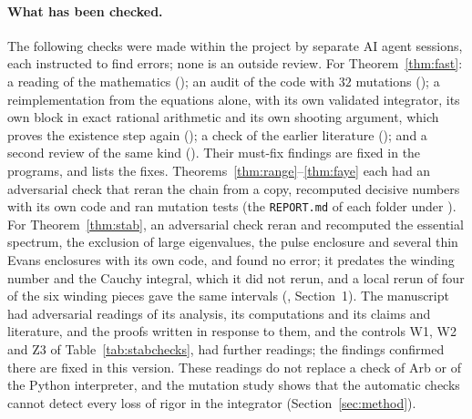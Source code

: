 \documentclass[11pt]{article}
\theoremstyle{definition}
\begin{document}
\paragraph{What has been checked.} The following checks were made within the project by separate AI agent sessions, each instructed to find errors; none is an outside review. For Theorem~\ref{thm:fast}: a reading of the mathematics (); an audit of the code with $32$ mutations (); a reimplementation from the equations alone, with its own validated integrator, its own block in exact rational arithmetic and its own shooting argument, which proves the existence step again (); a check of the earlier literature (); and a second review of the same kind (). Their must-fix findings are fixed in the programs, and  lists the fixes. Theorems~\ref{thm:range}--\ref{thm:faye} each had an adversarial check that reran the chain from a copy, recomputed decisive numbers with its own code and ran mutation tests (the \texttt{REPORT.md} of each folder under ). For Theorem~\ref{thm:stab}, an adversarial check reran and recomputed the essential spectrum, the exclusion of large eigenvalues, the pulse enclosure and several thin Evans enclosures with its own code, and found no error; it predates the winding number and the Cauchy integral, which it did not rerun, and a local rerun of four of the six winding pieces gave the same intervals (, Section~1). The manuscript had adversarial readings of its analysis, its computations and its claims and literature, and the proofs written in response to them, and the controls W1, W2 and Z3 of Table~\ref{tab:stabchecks}, had further readings; the findings confirmed there are fixed in this version. These readings do not replace a check of Arb or of the Python interpreter, and the mutation study shows that the automatic checks cannot detect every loss of rigor in the integrator (Section~\ref{sec:method}).
\end{document}
